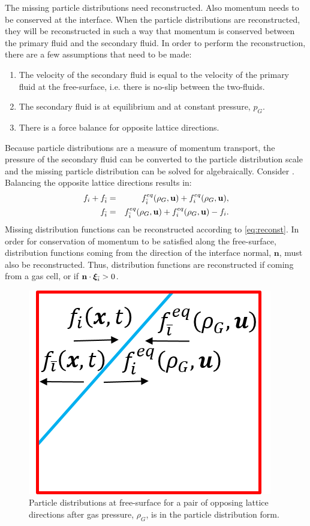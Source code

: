\documentclass[pdftex,ms]{pittetd}
\newcommand{\pvel}{\boldsymbol{\xi}}
\begin{document}
The missing particle distributions need reconstructed.
Also momentum needs to be conserved at the interface.
When the particle distributions are reconstructed, they will be reconstructed in such a way that momentum is conserved between the primary fluid and the secondary fluid.
In order to perform the reconstruction, there are a few assumptions that need to be made:
\begin{enumerate}
\item The velocity of the secondary fluid is equal to the velocity of the primary fluid at the free-surface, i.e. there is no-slip between the two-fluids.
\item The secondary fluid is at equilibrium and at constant pressure, $p_G$.
\item There is a force balance for opposite lattice directions.
\end{enumerate}
Because particle distributions are a measure of momentum transport, the pressure of the secondary fluid can be converted to the particle distribution scale and the missing particle distribution can be solved for algebraically.
Consider .
Balancing the opposite lattice directions results in:
\begin{eqnarray}
f_i + f_{\bar{i}} &=& f^{eq}_{\bar{i}}(\rho_G, \mathbf{u}) + f_i^{eq}(\rho_G, \mathbf{u}), \\
\label{eq:reconst} f_{\bar{i}} &=& f_{\bar{i}}^{eq}(\rho_G, \mathbf{u}) + f_i^{eq}(\rho_G, \mathbf{u}) - f_i.
\end{eqnarray}
Missing distribution functions can be reconstructed according to \eqref{eq:reconst}.
In order for conservation of momentum to be satisfied along the free-surface, distribution functions coming from the direction of the interface normal, $\mathbf{n}$, must also be reconstructed.
Thus, distribution functions are reconstructed if coming from a gas cell, or if $\mathbf{n} \cdot \pvel_\opidx > 0$.

\begin{figure}
\centering
\includegraphics{figs/force-bal-at-interface}
\caption{Particle distributions at free-surface for a pair of opposing lattice directions after gas pressure, $\rho_G$, is in the particle distribution form.}
\label{fig:fbi}
\end{figure}
\end{document}
